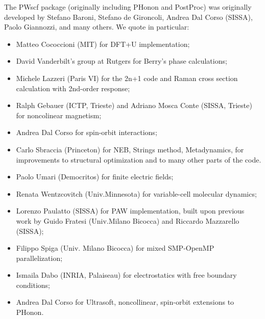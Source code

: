 \documentclass[12pt,a4paper]{article}
\begin{document}
The PWscf package (originally including PHonon and PostProc)
was originally developed by Stefano Baroni, Stefano
de Gironcoli, Andrea Dal Corso (SISSA), Paolo Giannozzi, and many others.
We quote in particular:
\begin{itemize}
  \item Matteo Cococcioni (MIT) for DFT+U implementation;
  \item David Vanderbilt's group at Rutgers for Berry's phase calculations;
  \item Michele Lazzeri (Paris VI) for the 2n+1 code and Raman cross section
 calculation with 2nd-order response;
  \item Ralph Gebauer (ICTP, Trieste) and Adriano Mosca Conte (SISSA, Trieste) 
for noncolinear magnetism;
  \item Andrea Dal Corso for spin-orbit interactions;
  \item Carlo Sbraccia (Princeton) for NEB, Strings method, Metadynamics, for 
improvements to structural optimization and to many other parts of the code.
  \item Paolo Umari (Democritos) for finite electric fields;
  \item Renata Wentzcovitch (Univ.Minnesota) for variable-cell molecular 
dynamics;
  \item Lorenzo Paulatto (SISSA) for PAW implementation, built upon previous 
work by Guido Fratesi (Univ.Milano Bicocca) and Riccardo Mazzarello (SISSA);
\item Filippo Spiga (Univ. Milano Bicocca) for mixed SMP-OpenMP
 parallelization;
 \item Ismaila Dabo (INRIA, Palaiseau) for electrostatics with
 free boundary conditions;
 \item Andrea Dal Corso for Ultrasoft, noncollinear, spin-orbit
 extensions to PHonon.
\end{itemize}
\end{document}
